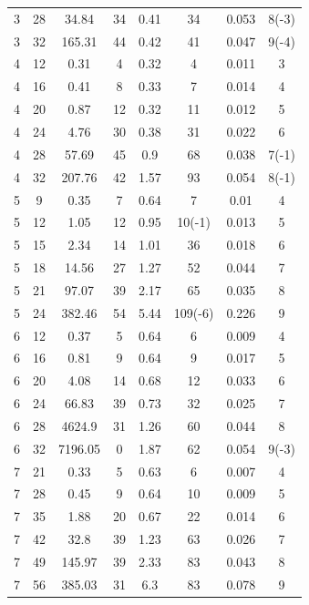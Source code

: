 \documentclass[11pt,authoryear,a4paper]{article}
\theoremstyle{definition}
\begin{document}
\begin{table}[tbp]
\begin{tabular}{cccccccc}
3         & 28     & 34.84   & 34        & 0.41 & 34        & 0.053 & 8(-3)         \\
3         & 32     & 165.31  & 44        & 0.42 & 41        & 0.047 & 9(-4)         \\
4         & 12     & 0.31    & 4         & 0.32 & 4         & 0.011 & 3         \\
4         & 16     & 0.41    & 8         & 0.33 & 7         & 0.014 & 4         \\
4         & 20     & 0.87    & 12        & 0.32 & 11        & 0.012 & 5         \\
4         & 24     & 4.76    & 30        & 0.38 & 31        & 0.022 & 6         \\
4         & 28     & 57.69   & 45        & 0.9  & 68        & 0.038 & 7(-1)         \\
4         & 32     & 207.76  & 42        & 1.57 & 93        & 0.054 & 8(-1)         \\
5         & 9      & 0.35    & 7         & 0.64 & 7         & 0.01  & 4         \\
5         & 12     & 1.05    & 12        & 0.95 & 10(-1)        & 0.013 & 5         \\
5         & 15     & 2.34    & 14        & 1.01 & 36        & 0.018 & 6         \\
5         & 18     & 14.56   & 27        & 1.27 & 52        & 0.044 & 7         \\
5         & 21     & 97.07   & 39        & 2.17 & 65        & 0.035 & 8         \\
5         & 24     & 382.46  & 54        & 5.44 & 109(-6)       & 0.226 & 9         \\
6         & 12     & 0.37    & 5         & 0.64 & 6         & 0.009 & 4         \\
6         & 16     & 0.81    & 9         & 0.64 & 9         & 0.017 & 5         \\
6         & 20     & 4.08    & 14        & 0.68 & 12        & 0.033 & 6         \\
6         & 24     & 66.83   & 39        & 0.73 & 32        & 0.025 & 7         \\
6         & 28     & 4624.9  & 31        & 1.26 & 60        & 0.044 & 8         \\
6         & 32     & 7196.05 & 0         & 1.87 & 62        & 0.054 & 9(-3)         \\
7         & 21     & 0.33    & 5         & 0.63 & 6         & 0.007 & 4         \\
7         & 28     & 0.45    & 9         & 0.64 & 10        & 0.009 & 5         \\
7         & 35     & 1.88    & 20        & 0.67 & 22        & 0.014 & 6         \\
7         & 42     & 32.8    & 39        & 1.23 & 63        & 0.026 & 7         \\
7         & 49     & 145.97  & 39        & 2.33 & 83        & 0.043 & 8         \\
7         & 56     & 385.03  & 31        & 6.3  & 83        & 0.078 & 9         \\


\end{tabular}
\end{table}
\end{document}
